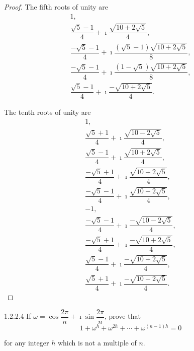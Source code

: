 \begin{proof}
	The fifth roots of unity are
	\begingroup
	\allowdisplaybreaks%
	\begin{align*}
		1,                                                                                \\
		\dfrac{\sqrt{5} - 1}{4} + \imath \dfrac{\sqrt{10 + 2\sqrt{5}}}{4},                \\
		\dfrac{-\sqrt{5} - 1}{4} + \imath \dfrac{(\sqrt{5} - 1)\sqrt{10 + 2\sqrt{5}}}{8}, \\
		\dfrac{-\sqrt{5} - 1}{4} + \imath \dfrac{(1 - \sqrt{5})\sqrt{10 + 2\sqrt{5}}}{8}, \\
		\dfrac{\sqrt{5} - 1}{4} + \imath \dfrac{-\sqrt{10 + 2\sqrt{5}}}{4}.
	\end{align*}
	\endgroup

	The tenth roots of unity are
	\begingroup
	\allowdisplaybreaks%
	\begin{align*}
		1,                                                                   \\
		\dfrac{\sqrt{5} + 1}{4} + \imath\dfrac{\sqrt{10 - 2\sqrt{5}}}{4},    \\
		\dfrac{\sqrt{5} - 1}{4} + \imath \dfrac{\sqrt{10 + 2\sqrt{5}}}{4},   \\
		\dfrac{-\sqrt{5} + 1}{4} + \imath \dfrac{\sqrt{10 + 2\sqrt{5}}}{4},  \\
		\dfrac{-\sqrt{5} - 1}{4} + \imath \dfrac{\sqrt{10 - 2\sqrt{5}}}{4},  \\
		-1,                                                                  \\
		\dfrac{-\sqrt{5} - 1}{4} + \imath \dfrac{-\sqrt{10 - 2\sqrt{5}}}{4}, \\
		\dfrac{-\sqrt{5} + 1}{4} + \imath \dfrac{-\sqrt{10 + 2\sqrt{5}}}{4}, \\
		\dfrac{\sqrt{5} - 1}{4} + \imath \dfrac{-\sqrt{10 + 2\sqrt{5}}}{4},  \\
		\dfrac{\sqrt{5} + 1}{4} + \imath\dfrac{-\sqrt{10 - 2\sqrt{5}}}{4}.
	\end{align*}
	\endgroup
\end{proof}

\begin{problem}{1.2.2.4}
If \( \omega = \cos\dfrac{2\pi}{n} + \imath\sin\dfrac{2\pi}{n} \), prove that
\[
	1 + \omega^{h} + \omega^{2h} + \cdots + \omega^{(n-1)h} = 0
\]

for any integer \(h\) which is not a multiple of \(n\).
\end{problem}

